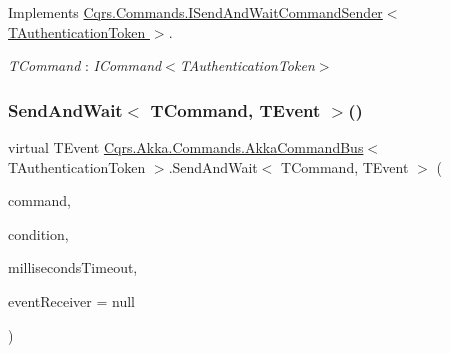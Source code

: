 Implements \hyperlink{interfaceCqrs_1_1Commands_1_1ISendAndWaitCommandSender_abc9bda930a4c8c57d8edf1044d2b8002_abc9bda930a4c8c57d8edf1044d2b8002}{Cqrs.\+Commands.\+I\+Send\+And\+Wait\+Command\+Sender$<$ T\+Authentication\+Token $>$}.

\begin{Desc}
\item[Type Constraints]\begin{description}
\item[{\em T\+Command} : {\em I\+Command$<$T\+Authentication\+Token$>$}]\end{description}
\end{Desc}
\mbox{\label{classCqrs_1_1Akka_1_1Commands_1_1AkkaCommandBus_affd63fcc939b04803ca58dad194fc723_affd63fcc939b04803ca58dad194fc723}} 
\subsubsection{\texorpdfstring{Send\+And\+Wait$<$ T\+Command, T\+Event $>$()}{SendAndWait< TCommand, TEvent >()}\hspace{0.1cm}{\footnotesize\ttfamily [5/6]}}
{\footnotesize\ttfamily virtual T\+Event \hyperlink{classCqrs_1_1Akka_1_1Commands_1_1AkkaCommandBus}{Cqrs.\+Akka.\+Commands.\+Akka\+Command\+Bus}$<$ T\+Authentication\+Token $>$.Send\+And\+Wait$<$ T\+Command, T\+Event $>$ (\begin{DoxyParamCaption}\item[{T\+Command}]{command,  }\item[{Func$<$ I\+Enumerable$<$ \hyperlink{interfaceCqrs_1_1Events_1_1IEvent}{I\+Event}$<$ T\+Authentication\+Token $>$$>$, T\+Event $>$}]{condition,  }\item[{int}]{milliseconds\+Timeout,  }\item[{\hyperlink{interfaceCqrs_1_1Events_1_1IEventReceiver}{I\+Event\+Receiver}$<$ T\+Authentication\+Token $>$}]{event\+Receiver = {\ttfamily null} }\end{DoxyParamCaption})\hspace{0.3cm}{\ttfamily [virtual]}}



